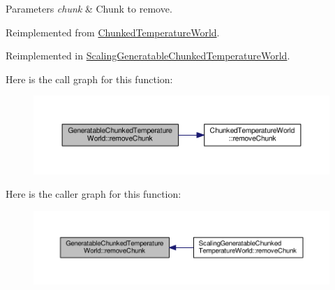 \begin{DoxyParams}{Parameters}
{\em chunk} & Chunk to remove. \\
\hline
\end{DoxyParams}


Reimplemented from \hyperlink{class_chunked_temperature_world_a623c1f5efe7aa84d428ba58365ee775a}{Chunked\-Temperature\-World}.



Reimplemented in \hyperlink{class_scaling_generatable_chunked_temperature_world_ac3ae4d696d934b925076eeab88658978}{Scaling\-Generatable\-Chunked\-Temperature\-World}.



Here is the call graph for this function\-:
\nopagebreak
\begin{figure}[H]
\begin{center}
\leavevmode
\includegraphics[width=350pt]{class_generatable_chunked_temperature_world_a42c646343bb79dcdeb9f96e6aa06cbec_cgraph}
\end{center}
\end{figure}




Here is the caller graph for this function\-:
\nopagebreak
\begin{figure}[H]
\begin{center}
\leavevmode
\includegraphics[width=350pt]{class_generatable_chunked_temperature_world_a42c646343bb79dcdeb9f96e6aa06cbec_icgraph}
\end{center}
\end{figure}




